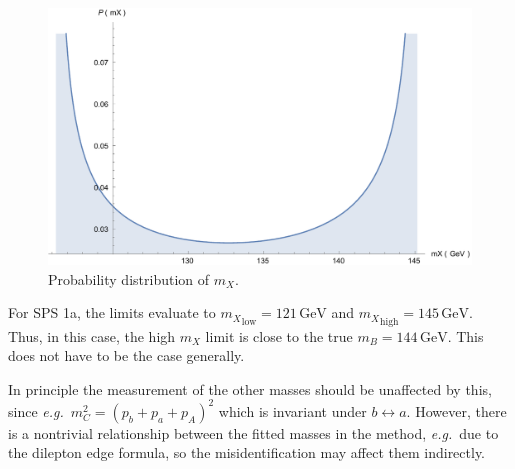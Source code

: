 \documentclass[twoside,english]{uiofysmaster}
\begin{document}
\begin{figure}[hbt]
\centering
\includegraphics[scale=0.4]{figures/appendix/mX-distribution.pdf}
\caption{Probability distribution of $m_X$.}
\label{fig:mX-dist_improvementchap}
\end{figure}
For SPS 1a, the limits evaluate to ${m_X}_\mathrm{low} = 121 \, \mathrm{GeV}$ and ${m_X}_\mathrm{high} = 145 \,\mathrm{GeV}$. Thus, in this case, the high $m_X$ limit is close to the true $m_B = 144 \,\mathrm{GeV}$. This does not have to be the case generally. 

In principle the measurement of the other masses should be unaffected by this, since {\it e.g.}\ $m_C^2 = (p_b + p_a + p_A)^2$ which is invariant under $b\leftrightarrow a$. However, there is a nontrivial relationship between the fitted masses in the method, {\it e.g.}\ due to the dilepton edge formula, so the misidentification may affect them indirectly.
\end{document}
